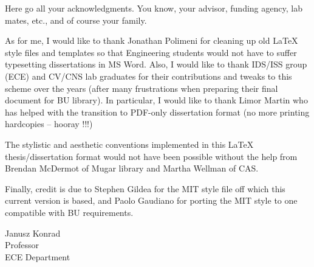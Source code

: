 Here go all your acknowledgments. You know, your advisor, funding agency, lab
mates, etc., and of course your family.

As for me, I would like to thank Jonathan Polimeni for cleaning up old LaTeX
style files and templates so that Engineering students would not have to suffer
typesetting dissertations in MS Word. Also, I would like to thank IDS/ISS
group (ECE) and CV/CNS lab graduates for their contributions and tweaks to this
scheme over the years (after many frustrations when preparing their final
document for BU library). In particular, I would like to thank Limor Martin who
has helped with the transition to PDF-only dissertation format (no more printing
hardcopies -- hooray !!!)

The stylistic and aesthetic conventions implemented in this LaTeX
thesis/dissertation format would not have been possible without the help from
Brendan McDermot of Mugar library and Martha Wellman of CAS.

Finally, credit is due to Stephen Gildea for the MIT style file off which this
current version is based, and Paolo Gaudiano for porting the MIT style to one
compatible with BU requirements.

\vskip 1in

\noindent
Janusz Konrad\\
Professor\\
ECE Department